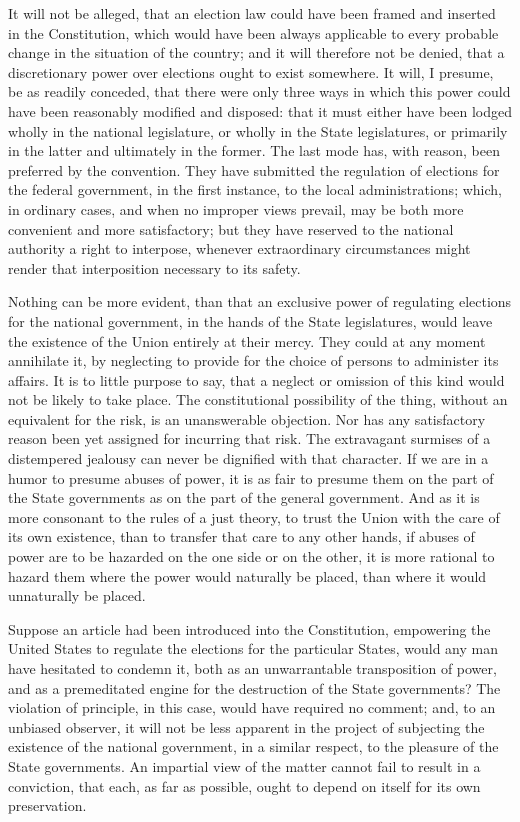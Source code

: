 It will not be alleged, that an election law could have been framed and inserted in the Constitution, which would have been always applicable to every probable change in the situation of the country; and it will therefore not be denied, that a discretionary power over elections ought to exist somewhere. It will, I presume, be as readily conceded, that there were only three ways in which this power could have been reasonably modified and disposed: that it must either have been lodged wholly in the national legislature, or wholly in the State legislatures, or primarily in the latter and ultimately in the former. The last mode has, with reason, been preferred by the convention. They have submitted the regulation of elections for the federal government, in the first instance, to the local administrations; which, in ordinary cases, and when no improper views prevail, may be both more convenient and more satisfactory; but they have reserved to the national authority a right to interpose, whenever extraordinary circumstances might render that interposition necessary to its safety.

Nothing can be more evident, than that an exclusive power of regulating elections for the national government, in the hands of the State legislatures, would leave the existence of the Union entirely at their mercy. They could at any moment annihilate it, by neglecting to provide for the choice of persons to administer its affairs. It is to little purpose to say, that a neglect or omission of this kind would not be likely to take place. The constitutional possibility of the thing, without an equivalent for the risk, is an unanswerable objection. Nor has any satisfactory reason been yet assigned for incurring that risk. The extravagant surmises of a distempered jealousy can never be dignified with that character. If we are in a humor to presume abuses of power, it is as fair to presume them on the part of the State governments as on the part of the general government. And as it is more consonant to the rules of a just theory, to trust the Union with the care of its own existence, than to transfer that care to any other hands, if abuses of power are to be hazarded on the one side or on the other, it is more rational to hazard them where the power would naturally be placed, than where it would unnaturally be placed.

Suppose an article had been introduced into the Constitution, empowering the United States to regulate the elections for the particular States, would any man have hesitated to condemn it, both as an unwarrantable transposition of power, and as a premeditated engine for the destruction of the State governments? The violation of principle, in this case, would have required no comment; and, to an unbiased observer, it will not be less apparent in the project of subjecting the existence of the national government, in a similar respect, to the pleasure of the State governments. An impartial view of the matter cannot fail to result in a conviction, that each, as far as possible, ought to depend on itself for its own preservation.

